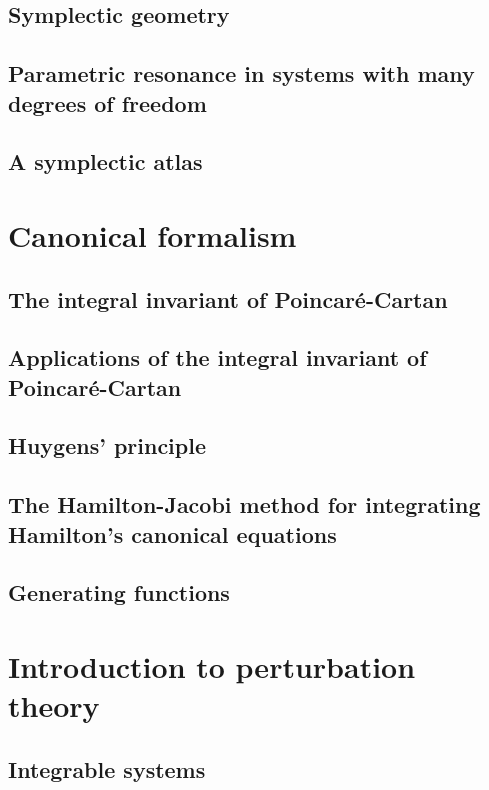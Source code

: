 \documentclass{book}
\numberwithin{equation}{section}
\theoremstyle{plain}
\theoremstyle{definition}
\theoremstyle{remark}
\theoremstyle{smallcap}
\numberwithin{prob}{section}
\begin{document}
\section{Symplectic geometry}

\section{Parametric resonance in systems with many degrees of freedom}

\section{A symplectic atlas}

\chapter{Canonical formalism}

\section{The integral invariant of Poincar\'e-Cartan}

\section{Applications of the integral invariant of Poincar\'e-Cartan}

\section{Huygens' principle}

\section{The Hamilton-Jacobi method for integrating Hamilton's canonical equations}

\section{Generating functions}

\chapter{Introduction to perturbation theory}

\section{Integrable systems}
\end{document}
